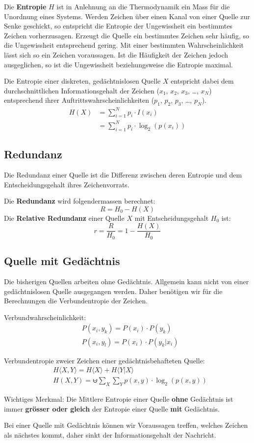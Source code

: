 Die \textbf{Entropie} $H$ ist in Anlehnung an die Thermodynamik ein Mass für die
Unordnung eines Systems. Werden Zeichen über einen Kanal von einer Quelle zur
Senke geschickt, so entspricht die Entropie der Ungewissheit ein bestimmtes
Zeichen vorherzusagen. Erzeugt die Quelle ein bestimmtes Zeichen sehr häufig, so
die Ungewissheit entsprechend gering. Mit einer bestimmten Wahrscheinlichkeit
lässt sich so ein Zeichen voraussagen. Ist die Häufigkeit der Zeichen jedoch
ausgeglichen, so ist die Ungewissheit beziehungsweise die Entropie maximal. 

Die Entropie einer diskreten, gedächtnislosen Quelle $X$ entspricht dabei dem
durchschnittlichen Informationsgehalt der Zeichen ($x_1$, $x_2$, $x_3$, \ldots,
$x_N$) entsprechend ihrer Auftrittswahrscheinlichkeiten ($p_1$, $p_2$, $p_3$,
\ldots, $p_N$). 
\begin{align*}
H(X)& =\sum\limits_{i=1}^N p_i \cdot I(x_i) \\
& =\sum\limits_{i=1}^N p_i \cdot \log_2\left(p(x_i)\right)
\end{align*}


\subsection{Redundanz}

Die Redundanz einer Quelle ist die Differenz zwischen deren Entropie und dem
Entscheidungsgehalt ihres Zeichenvorrats.

Die \textbf{Redundanz} wird folgendermassen berechnet:
\[
	R = H_0 - H(X)
\]
Die \textbf{Relative Redundanz} einer Quelle $X$ mit Entscheidungsgehalt $H_0$
ist:
\[
	r = \frac{R}{H_0} = 1 - \frac{H(X)}{H_0}
\]


\subsection{Quelle mit Gedächtnis}

Die bisherigen Quellen arbeiten ohne Gedächtnis. Allgemein kann nicht von einer
gedächtnislosen Quelle ausgegangen werden. Daher benötigen wir für die
Berechnungen die Verbundentropie der Zeichen.

Verbundwahrscheinlichkeit:
\begin{align*}
	&P(x_i, y_k) = P(x_i) \cdot P(y_k) \\
	&P(x_i, y_l) = P(x_i) \cdot P(y_k|x_i)
\end{align*}

Verbundentropie zweier Zeichen einer gedächtnisbehafteten Quelle:
\begin{align*}
	&H \langle X,Y \rangle = H \langle X \rangle + H \langle Y|X \rangle \\
	&H(X,Y) = \uminus \sum_X \sum_Y p(x,y) \cdot \log_2\left(p(x,y)\right)
\end{align*}

Wichtiges Merkmal: Die Mittlere Entropie einer Quelle \textbf{ohne} Gedächtnis
ist immer \textbf{grösser oder gleich} der Entropie einer Quelle \textbf{mit}
Gedächtnis.

Bei einer Quelle mit Gedächtnis können wir Voraussagen treffen, welches Zeichen
als nächstes kommt, daher sinkt der Informationsgehalt der Nachricht.

